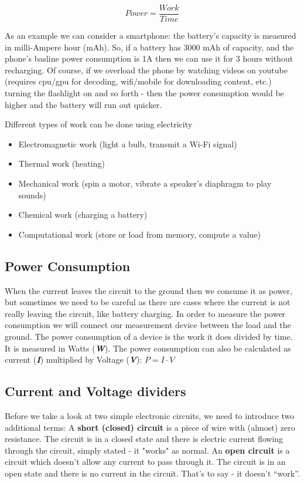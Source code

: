 \begin{displaymath}\label{eq:power_consumption}
    Power = \frac{Work}{Time}
\end{displaymath}

As an example we can consider a smartphone: the battery's capacity is measured in milli-Ampere hour (mAh).
So, if a battery has 3000 mAh of capacity, and the phone's basline power consumption is 1A  then we can use it
for 3 hours without recharging. Of course, if we overload the phone by watching videos on youtube (requires cpu/gpu for decoding, wifi/mobile for downloading content, etc.)
turning the flashlight on and so forth - then the power consumption would be higher and the battery will run out quicker. 

Different types of work can be done using electricity
\begin{itemize}
    \item Electromagnetic work (light a bulb, transmit a Wi-Fi signal)
    \item Thermal work (heating)
    \item Mechanical work (spin a motor, vibrate a speaker's diaphragm to play sounds)
    \item Chemical work (charging a battery)
    \item Computational work (store or load from memory, compute a value)
\end{itemize}

\subsection{Power Consumption}

When the current leaves the circuit to the ground then we consume it as power,
but sometimes we need to be careful as there are cases where the current is not really
leaving the circuit, like battery charging. In order to measure the power consumption we
will connect our measurement device between the load and the ground. The power
consumption of a device is the work it does divided by time. It is measured in
Watts (\textbf{\textit{W}}). The power consumption can also be calculated as current
(\textbf{\textit{I}}) multiplied by Voltage (\textbf{\textit{V}}): $P = I \cdot V$

\subsection{Current and Voltage dividers}
Before we take a look at two simple electronic circuits, we need to introduce
two additional terms: A \textbf{short (closed) circuit} is a piece of wire with
(almost) zero resistance. The circuit is in a closed state and there is
electric current flowing through the circuit, simply stated - it "works" as normal. An \textbf{open
circuit} is a circuit which doesn't allow any current to pass through it. The
circuit is in an open state and there is no current in the circuit. That's to
say - it doesn't ``work''.

